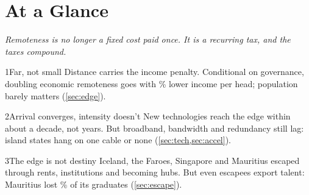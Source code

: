 \clearpage
\thispagestyle{plain}
\section*{At a Glance}

{\large\itshape\color{teal} Remoteness is no longer a fixed cost paid once.
It is a recurring tax, and the taxes compound.\par}
\vspace{14pt}

\noindent
\begin{minipage}[t]{0.32\linewidth}
\begin{claimtile}{1\enspace Far, not small}
Distance carries the income penalty. Conditional on governance, doubling
economic remoteness goes with \regDoubleRemotePctAbs\% lower income per head;
population barely matters (\cref{sec:edge}).
\end{claimtile}
\end{minipage}\hfill
\begin{minipage}[t]{0.32\linewidth}
\begin{claimtile}{2\enspace Arrival converges, intensity doesn't}
New technologies reach the edge within about a decade, not \lagOldMedian{} years.
But broadband, bandwidth and redundancy still lag: \nSIDSOneCable{} island
states hang on one cable or none (\cref{sec:tech,sec:accel}).
\end{claimtile}
\end{minipage}\hfill
\begin{minipage}[t]{0.32\linewidth}
\begin{claimtile}{3\enspace The edge is not destiny}
Iceland, the Faroes, Singapore and Mauritius escaped through rents,
institutions and becoming hubs. But even escapees export talent: Mauritius
lost \emigMauritius\% of its graduates (\cref{sec:escape}).
\end{claimtile}
\end{minipage}

